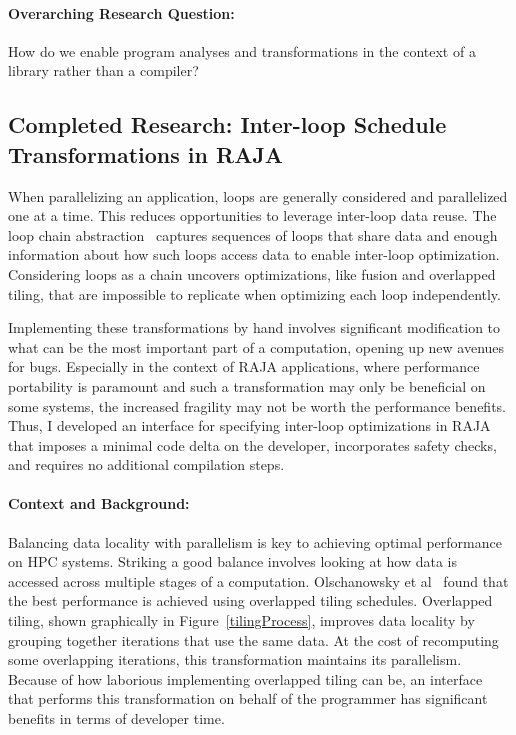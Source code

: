 \documentclass{article}
\begin{document}
\paragraph{Overarching Research Question:} How do we enable program analyses and transformations in the context of a library rather than a compiler?

\subsection{Completed Research: Inter-loop Schedule Transformations in RAJA}
\label{Sec:Work1}
When parallelizing an application, loops are generally considered and
parallelized one at a time.
This reduces opportunities to leverage inter-loop data reuse.
The loop chain abstraction~\cite{krieger2013loop} captures sequences of loops that share 
data and enough information about how such loops access 
data to enable inter-loop optimization.
Considering loops as a chain uncovers optimizations, like fusion
and overlapped tiling, that are impossible to replicate when optimizing
each loop independently.

Implementing these transformations by hand involves significant modification to what can be the most important part of a computation, opening up new avenues for bugs. 
Especially in the context of RAJA applications, where performance portability is paramount and such a transformation may only be beneficial on some systems, the increased fragility may not be worth the performance benefits. 
Thus, I developed an interface for specifying inter-loop optimizations in RAJA that imposes a minimal code delta on the developer, incorporates safety checks, and requires no additional compilation steps. 

\paragraph{Context and Background:}

Balancing data locality with parallelism is key to achieving optimal performance on HPC systems. 
Striking a good balance involves looking at how data is accessed across multiple stages of a computation.
Olschanowsky et al~\cite{olschanowsky2014study} found that the best performance is achieved using overlapped tiling schedules. 
Overlapped tiling, shown graphically in Figure~\ref{tilingProcess}, improves data locality by grouping together iterations that use the same data.
At the cost of recomputing some overlapping iterations, this transformation maintains its parallelism.
Because of how laborious implementing overlapped tiling can be, an interface that performs this transformation on behalf of the programmer has significant benefits in terms of developer time. 
\end{document}
